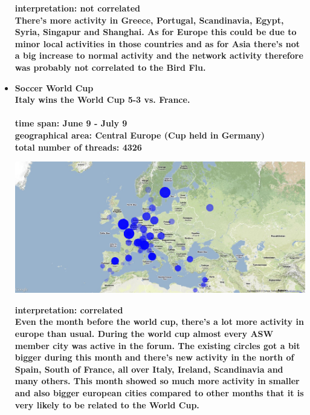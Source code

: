 \documentclass[11pt,a4paper,english]{article}
\begin{document}
\begin{itemize}
						\bf interpretation: \rm not correlated
						\\ There's more activity in Greece, Portugal, Scandinavia, Egypt, Syria, Singapur and Shanghai. As for Europe this could be due to minor local activities in those countries and as for Asia there's not a big increase to normal activity and the network activity therefore was probably not correlated to the Bird Flu.
	
					
					\item \bf Soccer World Cup \rm
						\\ Italy wins the World Cup 5-3 vs. France.
						\\\\ \bf time span: \rm June 9 - July 9
						\\ \bf geographical area: \rm Central Europe (Cup held in Germany)
						\\ \bf total number of threads: \rm 4326
						
						\includegraphics[width=130mm]{img/post-wcfinal}
						
						\bf interpretation: \rm correlated
						\\ Even the month before the world cup, there's a lot more activity in europe than usual. During the world cup almost every ASW member city was active in the forum. The existing circles got a bit bigger during this month and there's new activity in the north of Spain, South of France, all over Italy, Ireland, Scandinavia and many others. This month showed so much more activity in smaller and also bigger european cities compared to other months that it is very likely to be related to the World Cup.
						\begin{figure}[H]
							\vspace{-13pt}
  						

\end{figure}
\end{itemize}
\end{document}
